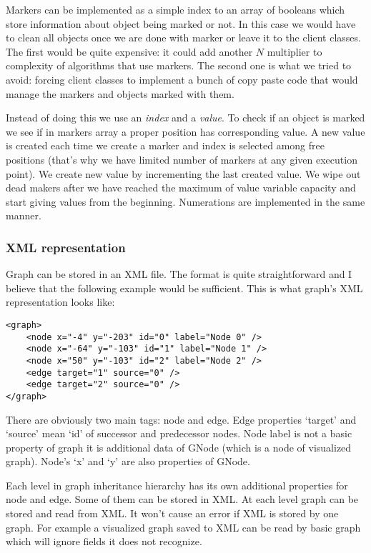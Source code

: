 \documentclass[11pt,twoside,a4paper]{article}
\begin{document}
Markers can be implemented as a simple index to an array of booleans which store information about object being marked or not. In this case we would have to clean all objects once we are done with marker or leave it to the client classes. The first would be quite expensive: it could add another $N$ multiplier to complexity of algorithms that use markers. The second one is what we tried to avoid: forcing client classes to implement a bunch of copy paste code that would manage the markers and objects marked with them.

Instead of doing this we use an \emph{index} and a \emph{value}. To check if an object is marked we see if in markers array a proper position has corresponding value. A new value is created each time we create a marker and index is selected among free positions (that's why we have limited number of markers at any given execution point). We create new value by incrementing the last created value. We wipe out dead makers after we have reached the maximum of value variable capacity and start giving values from the beginning. Numerations are implemented in the same manner.

\subsubsection{XML representation}
Graph can be stored in an XML file. The format is quite straightforward and I believe that the following example would be sufficient. This is what graph's XML representation looks like:
\begin{lstlisting}
<graph>
    <node x="-4" y="-203" id="0" label="Node 0" />
    <node x="-64" y="-103" id="1" label="Node 1" />
    <node x="50" y="-103" id="2" label="Node 2" />
    <edge target="1" source="0" />
    <edge target="2" source="0" />
</graph>
\end{lstlisting}
There are obviously two main tags: node and edge. Edge properties `target' and `source' mean `id' of successor and predecessor nodes. Node label is not a basic property of graph it is additional data of GNode (which is a node of visualized graph). Node's `x' and `y' are also properties of GNode.

Each level in graph inheritance hierarchy has its own additional properties for node and edge. Some of them can be stored in XML. At each level graph can be stored and read from XML. It won't cause an error if XML is stored by one graph. For example a visualized graph saved to XML can be read by basic graph which will ignore fields it does not recognize.
\end{document}
